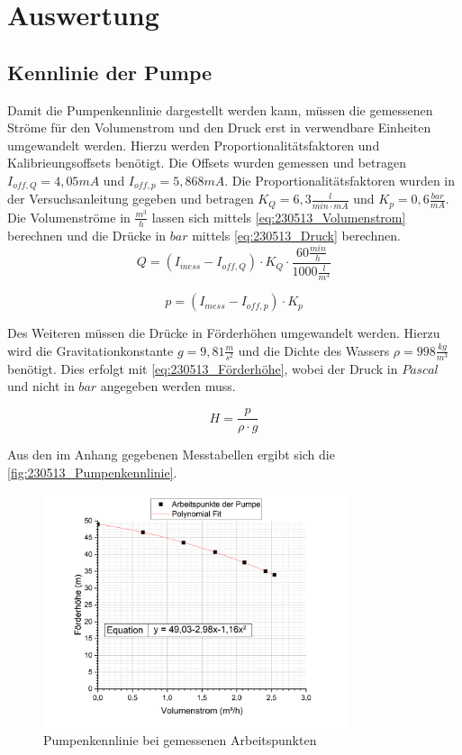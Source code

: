 \section{Auswertung}
\subsection{Kennlinie der Pumpe} \label{sec:230514_Kennlinie_der_Pumpe}
Damit die Pumpenkennlinie dargestellt werden kann, müssen die gemessenen Ströme für den Volumenstrom und den Druck erst in verwendbare Einheiten umgewandelt werden. 
Hierzu werden Proportionalitätsfaktoren und Kalibrieungsoffsets benötigt. 
Die Offsets wurden gemessen und betragen $I_{off,Q}=4,05 mA$ und $I_{off,p}=5,868 mA$.
Die Proportionalitätsfaktoren wurden in der Versuchsanleitung gegeben und betragen $K_Q = 6,3 \frac{l}{min \cdot mA}$ und $K_p = 0,6 \frac{bar}{mA}$.
Die Volumenströme in $\frac{m^3}{h}$ lassen sich mittels \autoref{eq:230513_Volumenstrom} berechnen und die Drücke in $bar$ mittels \autoref{eq:230513_Druck} berechnen.
\begin{equation}
  Q = (I_{mess}-I_{off,Q})\cdot K_Q \cdot \frac{60\frac{min}{h}}{1000\frac{l}{m^3}}
  \label{eq:230513_Volumenstrom}
\end{equation}

\begin{equation}
  p = (I_{mess}-I_{off,p})\cdot K_p
  \label{eq:230513_Druck}
\end{equation}

Des Weiteren müssen die Drücke in Förderhöhen umgewandelt werden. Hierzu wird die Gravitationkonstante $g = 9,81 \frac{m}{s^2}$ und die Dichte des Wassers $\rho = 998 \frac{kg}{m^3}$ benötigt.
Dies erfolgt mit \autoref{eq:230513_Förderhöhe}, wobei der Druck in $Pascal$ und nicht in $bar$ angegeben werden muss.

\begin{equation}
  H = \frac{p}{\rho \cdot g}
  \label{eq:230513_Förderhöhe}
\end{equation}

Aus den im Anhang gegebenen Messtabellen ergibt sich die \autoref{fig:230513_Pumpenkennlinie}.
\begin{figure}[H]
  \centering
  \includegraphics[width=0.8\textwidth]{Abbildungen/Pumpenkennlinie.png}
  \caption{Pumpenkennlinie bei gemessenen Arbeitspunkten}
  \label{fig:230513_Pumpenkennlinie}
\end{figure}

